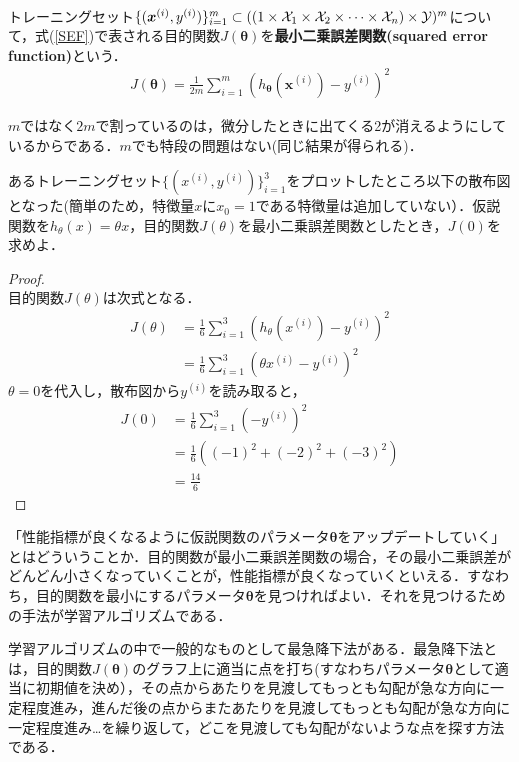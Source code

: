 \begin{defi}[最小二乗誤差関数]
　\\
トレーニングセット$\{({\bm x}^{(i)},y^{(i)})\}_{i=1}^m \subset ((1 \times {\cal X}_1 \times {\cal X}_2\times \cdots \times{\cal X}_n) \times {\cal Y})^m$について，式(\ref{SEF})で表される目的関数$J({\bm \theta})$を{\bf 最小二乗誤差関数(squared error function)}という．
\begin{align}
J({\bm \theta}) = \frac{1}{2m}\sum_{i=1}^m (h_{{\bm \theta}}({\bm x}^{(i)})-y^{(i)})^2 \label{SEF}
\end{align}
\end{defi}

\begin{rem}
$m$ではなく$2m$で割っているのは，微分したときに出てくる2が消えるようにしているからである．$m$でも特段の問題はない(同じ結果が得られる)．
\end{rem}

\begin{qu}
あるトレーニングセット$\{(x^{(i)},y^{(i)})\}_{i=1}^3$をプロットしたところ以下の散布図となった(簡単のため，特徴量$x$に$x_0=1$である特徴量は追加していない）．仮説関数を$h_{\theta}(x)=\theta x$，目的関数$J(\theta)$を最小二乗誤差関数としたとき，$J(0)$を求めよ．
\end{qu}
\begin{proof}
　\\
目的関数$J(\theta)$は次式となる．
\begin{align*}
J(\theta)&=\frac{1}{6}\sum_{i=1}^3 (h_{\theta}(x^{(i)})-y^{(i)})^2 \\
&=\frac{1}{6}\sum_{i=1}^3 (\theta x^{(i)}-y^{(i)})^2
\end{align*}
$\theta =0$を代入し，散布図から$y^{(i)}$を読み取ると，
\begin{align*}
J(0)&=\frac{1}{6}\sum_{i=1}^3 (-y^{(i)})^2 \\
&=\frac{1}{6}((-1)^2+(-2)^2+(-3)^2) \\
&= \frac{14}{6}
\end{align*}
\end{proof}

「性能指標が良くなるように仮説関数のパラメータ${\bm \theta}$をアップデートしていく」とはどういうことか．目的関数が最小二乗誤差関数の場合，その最小二乗誤差がどんどん小さくなっていくことが，性能指標が良くなっていくといえる．すなわち，目的関数を最小にするパラメータ${\bm \theta}$を見つければよい．それを見つけるための手法が学習アルゴリズムである．

学習アルゴリズムの中で一般的なものとして最急降下法がある．最急降下法とは，目的関数$J({\bm \theta})$のグラフ上に適当に点を打ち(すなわちパラメータ${\bm \theta}$として適当に初期値を決め），その点からあたりを見渡してもっとも勾配が急な方向に一定程度進み，進んだ後の点からまたあたりを見渡してもっとも勾配が急な方向に一定程度進み\ldots を繰り返して，どこを見渡しても勾配がないような点を探す方法である．

